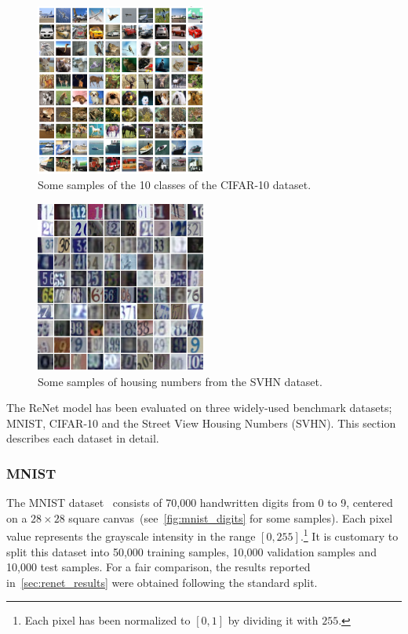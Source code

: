 \begin{figure}[!t]
    \centering
    \includegraphics[width=0.5\textwidth]{img/renet/cifar-10.png}
    \caption{Some samples of the 10 classes of the CIFAR-10 dataset.}
    \label{fig:cifar}
\end{figure}

\begin{figure}[!t]
    \centering
    \includegraphics[width=0.5\textwidth]{img/renet/SVHN.png}
    \caption{Some samples of housing numbers from the SVHN dataset.}
    \label{fig:svhn}
\end{figure}

The ReNet model has been evaluated on three widely-used benchmark datasets;
MNIST, CIFAR-10 and the Street View Housing Numbers (SVHN). This section
describes each dataset in detail.

\subsubsection{MNIST}
The MNIST dataset~\citep{Lecun99objectrecognition} consists of 70,000
handwritten digits from 0 to 9, centered on a $28\times 28$ square
canvas~(see~\autoref{fig:mnist_digits} for some samples). Each pixel value
represents the grayscale intensity in the range
$\left[0, 255\right]$.\footnote{Each pixel has been normalized to $[0, 1]$ by
dividing it with $255$.} It is customary to split this dataset into 50,000
training samples, 10,000 validation samples and 10,000 test samples. For a fair
comparison, the results reported in~\autoref{sec:renet_results} were obtained
following the standard split.

